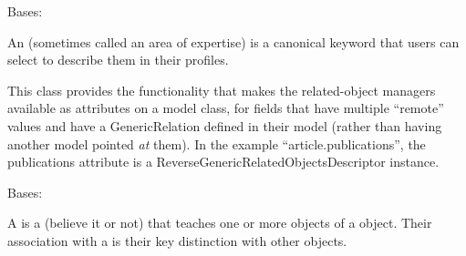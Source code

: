 \documentclass[letterpaper,10pt,english]{sphinxmanual}
\begin{document}
\begin{fulllineitems}
\label{generated/apps.profiles.models:apps.profiles.models.Expertise}
Bases: {\hyperref[generated/apps.profiles.models:apps.profiles.models.BaseModel]{}}

An  (sometimes called an area of expertise) is a canonical
keyword that users can select to describe them in their profiles.


\begin{fulllineitems}
\label{generated/apps.profiles.models:apps.profiles.models.Expertise.unit_permissions}
This class provides the functionality that makes the related-object
managers available as attributes on a model class, for fields that have
multiple ``remote'' values and have a GenericRelation defined in their model
(rather than having another model pointed \emph{at} them). In the example
``article.publications'', the publications attribute is a
ReverseGenericRelatedObjectsDescriptor instance.

\end{fulllineitems}


\end{fulllineitems}



\begin{fulllineitems}
\label{generated/apps.profiles.models:apps.profiles.models.FacultyMember}
Bases: {\hyperref[generated/apps.profiles.models:apps.profiles.models.Person]{}}

A  is a  (believe it or not) that teaches one or more
 objects of a  object.  Their association with a 
is their key distinction with other  objects.

\end{fulllineitems}


\end{document}
